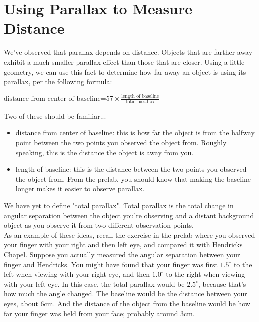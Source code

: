 \documentclass[11pt]{article}
\begin{document}
\newpage

\section{Using Parallax to Measure Distance}

We've observed that parallax depends on distance. Objects that are farther away exhibit a much smaller parallax effect than those that are closer. Using a little geometry, we can use this fact to determine how far away an object is using its parallax, per the following formula:

\begin{center}
	$\text{distance from center of baseline=}57\times\frac{\text{length of baseline}}{\text{total parallax}}$
\end{center}

Two of these should be familiar...
\begin{itemize}
	\item distance from center of baseline: this is how far the object is from the halfway point between the two points you observed the object from. Roughly speaking, this is the distance the object is away from you.
	\item length of baseline: this is the distance between the two points you observed the object from. From the prelab, you should know that making the baseline longer makes it easier to observe parallax.
\end{itemize}
We have yet to define "total parallax". Total parallax is the total change in angular separation between the object you're observing and a distant background object as you observe it from two different observation points.\\

As an example of these ideas, recall the exercise in the prelab where you observed your finger with your right and then left eye, and compared it with Hendricks Chapel. Suppose you actually measured the angular separation between your finger and Hendricks. You might have found that your finger was first $1.5^\circ$ to the left when viewing with your right eye, and then $1.0^\circ$ to the right when viewing with your left eye. In this case, the total parallax would be $2.5^\circ$, because that's how much the angle changed. The baseline would be the distance between your eyes, about 6cm. And the distance of the object from the baseline would be how far your finger was held from your face; probably around 3cm. \\
\end{document}
